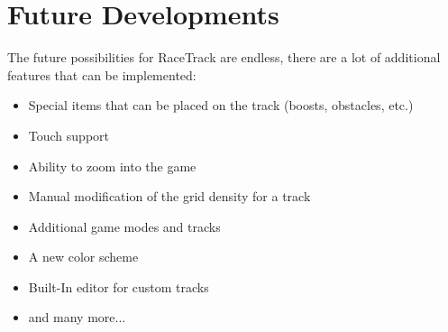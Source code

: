 \section{Future Developments}
	The future possibilities for RaceTrack are endless, there are a lot of additional features that can be implemented:
	\begin{itemize}
		\item Special items that can be placed on the track (boosts, obstacles, etc.)
		\item Touch support
		\item Ability to zoom into the game
		\item Manual modification of the grid density for a track
		\item Additional game modes and tracks
		\item A new color scheme
		\item Built-In editor for custom tracks
		\item and many more...
	\end{itemize}
